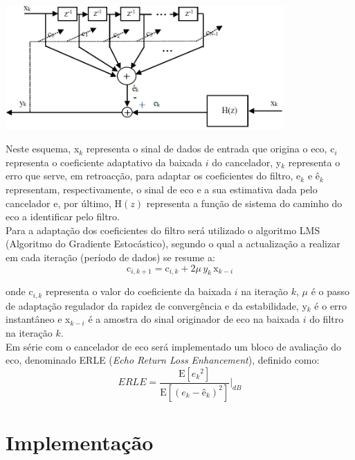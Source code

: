 \documentclass[a4paper,11pt]{report}
\begin{document}
	 \begin{center}
     \includegraphics[angle=0,width=0.8\textwidth]{esquema.png}
     \label{fig:esquema}
     \end{center}
     
 Neste esquema, x$_k$ representa o sinal de dados de entrada que origina o eco, c$_i$ representa o coeficiente adaptativo da baixada $i$ do cancelador, y$_k$ representa o erro que serve, em retroacção, para adaptar os coeficientes do filtro, e$_k$ e ê$_k$ representam, respectivamente, o sinal de eco e a sua estimativa dada pelo cancelador e, por último, H$(z)$ representa a função de sistema do caminho do eco a identificar pelo filtro.\\
 
Para a adaptação dos coeficientes do filtro será utilizado o algoritmo LMS (Algoritmo do Gradiente Estocástico), segundo o qual a actualização a realizar em cada iteração (período de dados) se resume a:
\begin{equation} \label{eq:coef}
\textrm{c}_{i,k+1}=\textrm{c}_{i,k}+2\mu\, y_k\,\textrm{x}_{k-i}
\end{equation}

onde c$_{i,k}$ representa o valor do coeficiente da baixada $i$ na iteração $k$, $\mu$ é o passo de adaptação regulador da rapidez de convergência e da estabilidade, y$_k$ é o erro instantâneo e x$_{k-i}$ é a amostra do sinal originador de eco na baixada $i$ do filtro na iteração $k$.\\

Em série com o cancelador de eco será implementado um bloco de avaliação do eco, denominado ERLE (\emph{Echo Return Loss Enhancement}), definido como:
\begin{equation} \label{eq:contaerle}
ERLE=\dfrac{\textrm{E}[{e_k}^2]}{\textrm{E}[(e_k-ê_k)^2]}\Bigg|_{dB}
\end{equation}

\section{Implementação}
\end{document}
